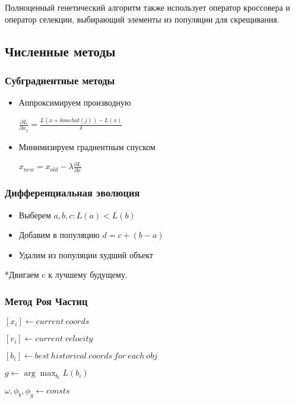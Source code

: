 Полноценный генетический алгоритм также использует оператор
кроссовера и оператор селекции, выбирающий элементы из популяции
для скрещивания.

\subsection*{Численные методы}

\subsubsection*{Субградиентные методы}

\begin{itemize}
    \item Аппроксимируем производную
    
    $\frac{\partial L}{\partial x_j} =
    \frac{L(x + \delta onehot(j)) - L(x)}{\delta}$
    \item Минимизируем градиентным спуском
    
    $x_{new} = x_{old} - \lambda \frac{\partial L}{\partial x}$
\end{itemize}


\subsubsection*{Дифференциальная эволюция}

\begin{itemize}
    \item Выберем $a, b, c: L(a) < L(b)$
    \item Добавим в популяцию $d = c + (b - a)$
    \item Удалим из популяции худший объект
\end{itemize}

*Двигаем c к лучшему будущему.

\subsubsection*{Метод Роя Частиц}

\begin{algorithm}
    $[x_i] \gets current\ coords$

    $[v_i] \gets current\ velocity$

    $[b_i] \gets best\ historical\ coords\ for\ each\ obj$

    $g \gets \arg \max_{b_i} L(b_i)$

    $\omega, \phi_b, \phi_g \gets consts$

\end{algorithm}


